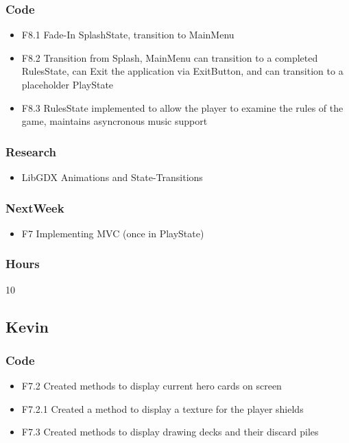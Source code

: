 \documentclass[10pt,a4paper]{article}
\begin{document}
\subsubsection*{Code}
\begin{itemize}
\item F8.1 Fade-In SplashState, transition to MainMenu
\item F8.2 Transition from Splash, MainMenu can transition to a completed RulesState, can Exit the application via ExitButton, and can transition to a placeholder PlayState
\item F8.3 RulesState implemented to allow the player to examine the rules of the game, maintains asyncronous music support
\end{itemize}
\subsubsection*{Research}
\begin{itemize}
\item LibGDX Animations and State-Transitions
\end{itemize}
\subsubsection*{NextWeek}
\begin{itemize}
\item F7 Implementing MVC (once in PlayState)
\end{itemize}
\subsubsection*{Hours}
10

\subsection*{Kevin}

\subsubsection*{Code}
\begin{itemize}
\item F7.2 Created methods to display current hero cards on screen
\item F7.2.1 Created a method to display a texture for the player shields
\item F7.3 Created methods to display drawing decks and their discard piles
\end{itemize}
\end{document}

